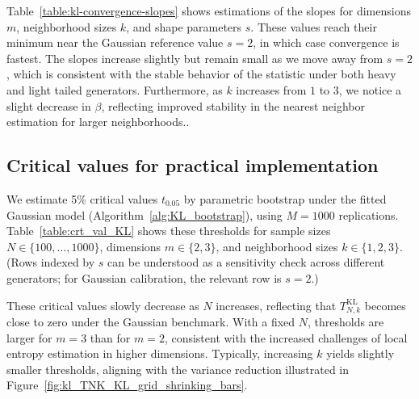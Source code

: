 \documentclass[12pt,a4paper]{article}
\theoremstyle{definition}
\theoremstyle{plain}
\begin{document}
{Table~\ref{table:kl-convergence-slopes} shows estimations of the slopes for dimensions $m$, neighborhood sizes $k$, and shape parameters $s$. These values reach their minimum near the Gaussian reference value $s=2$, in which case convergence is fastest. The slopes increase slightly but remain small as we move away from $s=2$, which is consistent with the stable behavior of the statistic under both heavy and light tailed generators. Furthermore, as $k$ increases from $1$ to $3$, we notice a slight decrease in $\beta$, reflecting improved stability in the nearest neighbor estimation for larger neighborhoods..


\subsection{Critical values for practical implementation}
\label{subsec:critical_values}
We estimate 5\% critical values $t_{0.05}$ by parametric bootstrap under the fitted Gaussian model
(Algorithm~\ref{alg:KL_bootstrap}), using $M=1000$ replications. Table~\ref{table:crt_val_KL} shows these thresholds for sample sizes $N\in\{100,\dots,1000\}$, dimensions $m\in\{2,3\}$, and neighborhood sizes
$k\in\{1,2,3\}$. (Rows indexed by $s$ can be understood as a sensitivity check across different generators; for Gaussian calibration, the relevant row is $s=2$.)

These critical values slowly decrease as $N$ increases, reflecting that $T_{N,k}^{\mathrm{KL}}$ becomes close to zero under the Gaussian benchmark. With a fixed $N$, thresholds are larger for $m=3$ than for $m=2$, consistent with the increased challenges of local entropy estimation in higher dimensions. Typically, increasing $k$ yields slightly smaller thresholds, aligning with the variance reduction illustrated in Figure~\ref{fig:kl_TNK_KL_grid_shrinking_bars}.

}
\end{document}
